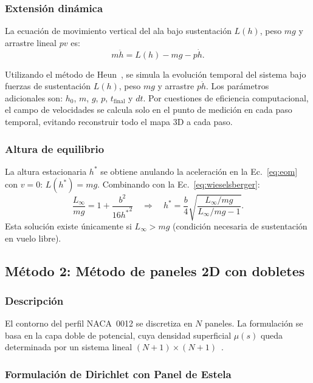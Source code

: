 \documentclass[twocolumn]{article}
\begin{document}
\subsubsection{Extensión dinámica}

La ecuación de movimiento vertical del ala bajo sustentación $L(h)$,
peso $mg$ y arrastre lineal $pv$ es:
\begin{equation}
  m\ddot{h} = L(h) - mg - p\dot{h}.
  \label{eq:eom}
\end{equation}

Utilizando el método de Heun~\cite{burden2015}, se simula la evolución temporal del sistema bajo fuerzas de sustentación $L(h)$, peso $mg$ y arrastre $ p\dot{h}$. Los parámetros adicionales son: $h_0$, $m$, $g$, $p$, $t_{\text{final}}$ y $dt$. Por cuestiones de eficiencia computacional, el campo de velocidades se calcula solo en el punto de medición en cada paso temporal, evitando reconstruir todo el mapa 3D a cada paso.

\subsubsection{Altura de equilibrio}

La altura estacionaria $h^*$ se obtiene anulando la aceleración en la
Ec.~\eqref{eq:eom} con $v = 0$: $L(h^*) = mg$. Combinando con la
Ec.~\eqref{eq:wieselsberger}:
\begin{equation}
  \frac{L_\infty}{mg} = 1 + \frac{b^2}{16{h^*}^2}
  \quad \Longrightarrow \quad
  h^* = \frac{b}{4}\sqrt{\frac{L_\infty/mg}{L_\infty/mg - 1}}.
  \label{eq:heq}
\end{equation}
Esta solución existe únicamente si $L_\infty > mg$
(condición necesaria de sustentación en vuelo libre).

\subsection{Método 2: Método de paneles 2D con dobletes}

\subsubsection{Descripción}

El contorno del perfil NACA~0012 se discretiza en $N$ paneles.
La formulación se basa en la capa doble de potencial, cuya densidad
superficial $\mu(s)$ queda determinada por un sistema lineal
$(N+1)\times(N+1)$~\cite{hess1967}.

\subsubsection{Formulación de Dirichlet con Panel de Estela}
\end{document}
